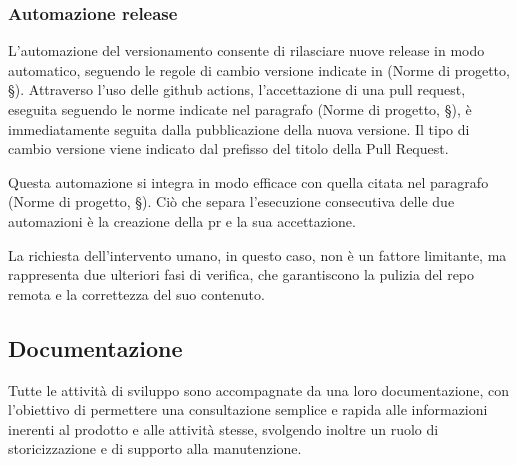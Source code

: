 \documentclass[10pt, a4paper]{article}
\begin{document}
\subsubsection{Automazione release}
L'automazione del versionamento consente di rilasciare nuove release in modo automatico, seguendo le regole di
cambio versione indicate in (Norme di progetto, \S {}). Attraverso l'uso delle github actions, l'accettazione di una pull request, eseguita seguendo le norme indicate nel
paragrafo (Norme di progetto, \S {}), è immediatamente seguita dalla pubblicazione della nuova versione.
Il tipo di cambio versione viene indicato dal prefisso del titolo della Pull Request.

Questa automazione si integra in modo efficace con quella citata nel paragrafo (Norme di progetto, \S {}).
Ciò che separa l'esecuzione consecutiva delle due automazioni è la creazione della pr e la sua accettazione.

La richiesta dell'intervento umano, in questo caso, non è un fattore limitante, ma rappresenta due ulteriori fasi di
verifica, che garantiscono la pulizia del repo remota e la correttezza del suo contenuto.

\subsection{Documentazione}
Tutte le attività di sviluppo sono accompagnate da una loro documentazione, con l'obiettivo di permettere una consultazione semplice e rapida alle informazioni inerenti al prodotto e alle attività stesse, svolgendo inoltre un ruolo di storicizzazione e di supporto alla manutenzione.
\end{document}
